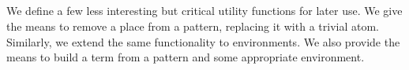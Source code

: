 \begin{code}
\AgdaSymbol{:}\AgdaSpace{}%
\AgdaSpace{}%
\AgdaSpace{}%
\AgdaSpace{}%
\AgdaSpace{}%
\AgdaSymbol{(}\AgdaSpace{}%
\AgdaSpace{}%
\AgdaSymbol{)}\AgdaSpace{}%
\AgdaSpace{}%
\AgdaSpace{}%
\AgdaSpace{}%
\AgdaSymbol{(}\AgdaSpace{}%
\AgdaOperator{\AgdaPrimitive{+}}\AgdaSpace{}%
\AgdaSymbol{)}\<%
\\
\>[0]%
\>[8]\AgdaSpace{}%
\AgdaSpace{}%
%
\>[19]\AgdaSymbol{=}\AgdaSpace{}%
\<%
\\
\>[0]\AgdaSymbol{(}\AgdaSpace{}%
\AgdaSymbol{)}%
\>[8]\AgdaSpace{}%
\AgdaSymbol{(}\AgdaSpace{}%
\AgdaSpace{}%
\AgdaSymbol{)}%
\>[19]\AgdaSymbol{=}\AgdaSpace{}%
\AgdaSpace{}%
\AgdaSpace{}%
\<%
\\
\>[0]\AgdaSymbol{(}\AgdaSpace{}%
\AgdaSymbol{)}%
\>[8]\AgdaSpace{}%
\AgdaSymbol{(}\AgdaSpace{}%
\AgdaSpace{}%
\AgdaSymbol{)}%
\>[19]\AgdaSymbol{=}\AgdaSpace{}%
\AgdaSpace{}%
\AgdaSpace{}%
\<%
\\
\>[0]\AgdaSpace{}%
%
\>[8]\AgdaSpace{}%
\AgdaSpace{}%
%
\>[19]\AgdaSymbol{=}\AgdaSpace{}%
\AgdaSpace{}%
\AgdaSpace{}%
\<%
\end{code}
We define a few less interesting but critical utility functions for later
use. We give the means to remove a place from a pattern, replacing it with
a trivial atom. Similarly, we extend the same functionality to environments.
We also provide the means to build a term from a pattern and some appropriate
environment.
